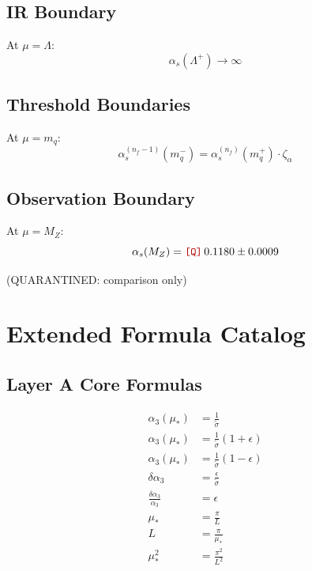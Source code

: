 \documentclass[11pt,a4paper]{article}
\newcommand{\Qnum}[1]{\textcolor{red!70!black}{\texttt{[Q]}}\,#1}
\theoremstyle{definition}
\begin{document}
\subsection{IR Boundary}
\label{subsec:app-ir-bc}

At $\mu = \Lambda$:
\begin{equation}
\label{eq:app-115}
\alpha_s(\Lambda^+) \to \infty
\end{equation}

\subsection{Threshold Boundaries}
\label{subsec:app-thresh-bc}

At $\mu = m_q$:
\begin{equation}
\label{eq:app-116}
\alpha_s^{(n_f-1)}(m_q^-) = \alpha_s^{(n_f)}(m_q^+) \cdot \zeta_\alpha
\end{equation}

\subsection{Observation Boundary}
\label{subsec:app-obs-bc}

At $\mu = M_Z$:
\begin{equation}
\label{eq:app-117}
\alpha_s(M_Z) = \Qnum{0.1180 \pm 0.0009}
\end{equation}

(QUARANTINED: comparison only)

\section{Extended Formula Catalog}
\label{app:extended-catalog}

\subsection{Layer A Core Formulas}
\label{subsec:ext-layer-a}

\begin{align}
\label{eq:ext-1}
\alpha_3(\mu_*) &= \frac{1}{\tilde{\sigma}} \\
\label{eq:ext-2}
\alpha_3(\mu_*) &= \frac{1}{\tilde{\sigma}}(1 + \epsilon) \\
\label{eq:ext-3}
\alpha_3(\mu_*) &= \frac{1}{\tilde{\sigma}}(1 - \epsilon) \\
\label{eq:ext-4}
\delta\alpha_3 &= \frac{\epsilon}{\tilde{\sigma}} \\
\label{eq:ext-5}
\frac{\delta\alpha_3}{\alpha_3} &= \epsilon \\
\label{eq:ext-6}
\mu_* &= \frac{\pi}{L} \\
\label{eq:ext-7}
L &= \frac{\pi}{\mu_*} \\
\label{eq:ext-8}
\mu_*^2 &= \frac{\pi^2}{L^2}
\end{align}
\end{document}
